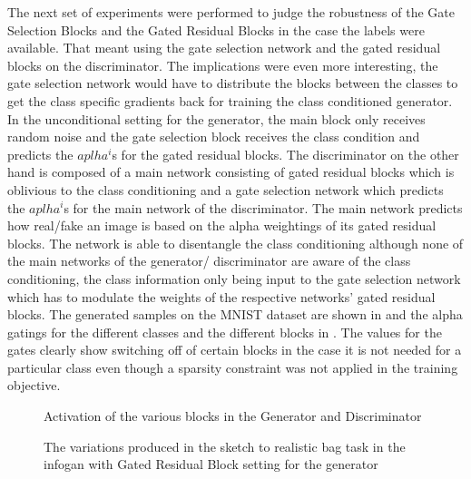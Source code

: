 The next set of experiments were performed to judge the robustness of the Gate Selection Blocks and the Gated Residual Blocks in the case the labels were available. That meant using the gate selection network and the gated residual blocks on the discriminator. The implications were even more interesting, the gate selection network would have to distribute the blocks between the classes to get the class specific gradients back for training the class conditioned generator. In the unconditional setting for the generator, the main block only receives random noise and the gate selection block receives the class condition and predicts the $aplha^i$s for the gated residual blocks. The discriminator on the other hand is composed of a main network consisting of gated residual blocks which is oblivious to the class conditioning and a gate selection network which predicts the $aplha^i$s for the main network of the discriminator. The main network predicts how real/fake an image is based on the alpha weightings of its gated residual blocks. The network is able to disentangle the class conditioning although none of the main networks of the generator/ discriminator are aware of the class conditioning, the class information only being input to the gate selection network which has to modulate the weights of the respective networks' gated residual blocks. The generated samples on the MNIST dataset are shown in  and the alpha gatings for the different classes and the different blocks in . The values for the gates clearly show switching off of certain blocks in the case it is not needed for a particular class even though a sparsity constraint was not applied in the training objective.


\begin{figure}%
    \centering
    \caption{Activation of the various blocks in the Generator and Discriminator}
    \label{fig:mnist_act}
    \vspace{-3mm}
\end{figure}






\begin{figure*}[t]%
    \centering
    \caption{The variations produced in the sketch to realistic bag task in the infogan with Gated Residual Block setting for the generator }
    \label{fig:infogan_bags}
    \vspace{-3mm}
\end{figure*}



